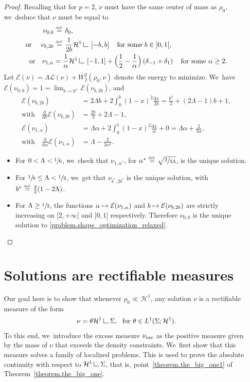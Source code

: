 \documentclass[JEP,XML,SOM,Unicode,NoFloatCountersInSection,published]{cedram}
\newcommand\mto{\mathchoice{\longmapsto}{\mapsto}{\mapsto}{\mapsto}}
\theoremstyle{definition}
\newcommand{\eqdef}{\ensuremath{\stackrel{\mbox{\upshape\tiny def.}}{=}}}
\newcommand\LM[1]{\hbox{\vrule width.5pt \vbox to#1pt{\vfill \hrule width#1pt height.5pt}}}
\newcommand\LL{{\mathchoice {\>\LM7\>}{\>\LM7\>}{\,\LM5\,}{\,\LM{3.35}\,}}}
\newcommand{\mres}{\LL}
\newcommand\E{\mathcal{E}}
\newcommand\cH{\mathcal{H}}
\newcommand\cL{\mathcal{L}}
\newcommand{\nuexc}{\nu_{\textup{exc}}}
\newcommand\dd{\mathrm{d}}
\newcommand{\oi}[2]{ \left] #1, #2 \right[ }
\newcommand{\ci}[2]{ \left[ #1, #2 \right] }
\begin{document}
\begin{proof}
Recalling that for $p=2$, $\nu$ must have the same center of mass as $\rho_0$, we~deduce that $\nu$ must be equal to
\begin{align*}
\nu_{0,0} &\eqdef\delta_0,\\
\mbox{or }\quad
\nu_{b,2b}&\eqdef \frac{1}{2b}\cH^1\mres\ci{-b}{b}\quad\mbox{for some $b \in \oi{0}{1}$},\\
\mbox{or}\quad \nu_{1,\alpha} &= \frac{1}{\alpha}\cH^1\mres\ci{-1}{1} + \Bigl(\frac{1}{2}-\frac{1}{\alpha}\Bigr)\left(\delta_{-1}+\delta_{1}\right)\quad \mbox{for some $\alpha\geq 2$.}
\end{align*}
Let $\E(\nu)= \Lambda \cL(\nu)+W_2^2(\rho_0,\nu)$ denote the energy to minimize. We~have $\E(\nu_{0,0})=1 = \lim_{b \to 0^+} \E(\nu_{b,2b})$, and
\begin{align*}
\E(\nu_{b,2b})&= 2\Lambda b + 2 \int_0^b (1-x)^2\frac{\dd x}{2b} = \frac{b^2}{3}+ (2\Lambda-1)b+1,\\
\mbox{with}\quad \frac{\dd}{\dd b}\E(\nu_{b,2b}) &= \frac{2b}{3}+2\Lambda-1,\\
\E(\nu_{1,\alpha})&= \Lambda \alpha + 2\int_0^1(1-x)^2\frac{\dd x}{\alpha}+0 = \Lambda \alpha +\frac{2}{3\alpha},\\
\mbox{with}\quad \frac{\dd}{\dd \alpha}\E(\nu_{1,\alpha}) &= \Lambda - \frac{2}{3\alpha^2}.
\end{align*}

\begin{itemize}
\item
For $0<\Lambda<\sfrac{1}{6}$, we~check that $\nu_{1,\alpha^*}$, for $\alpha^*\eqdef \sqrt{\sfrac{2}{3\Lambda}}$, is the unique solution.

\item
For $\sfrac{1}{6}\le \Lambda < \sfrac{1}{2}$, we~get that $\nu_{b^*,2b^*}$ is the unique solution, with $b^*\eqdef \frac{3}{2}(1-2\Lambda)$.

\item
For $\Lambda \geq \sfrac{1}{2}$, the functions $\alpha\mto \E(\nu_{1,\alpha})$ and $b\mto \E(\nu_{b,2b})$ are strictly increasing on $[2,+\infty[$ and $]0,1]$ respectively. Therefore $\nu_{0,0}$ is the unique solution to \eqref{problem.shape_optimization_relaxed}.\qedhere
\end{itemize}
\end{proof}

\section{Solutions are rectifiable measures}\label{section.solutions_are_absolutely_continuous}
Our goal here is to show that whenever $\rho_0 \ll \cH^1$, any solution $\nu$ is a rectifiable measure
of the form
\[
\nu = \theta \cH^1\mres \Sigma, \ \text{ for $\theta \in L^1(\Sigma; \cH^1)$}.
\]
To this end, we~introduce the excess measure $\nuexc$ as the positive measure given by the mass of $\nu$ that exceeds the density constraints. We~first show that this measure solves a family of localized problems. This is used to prove the absolute continuity with respect to $\cH^1\mres\Sigma$, that is, point~\eqref{theorem.the_big_one1} of Theorem~\ref{theorem.the_big_one}.
\end{document}
